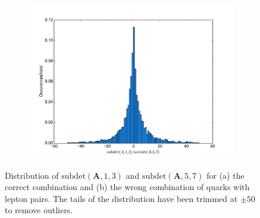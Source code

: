 \documentclass[twoside,english]{uiofysmaster}
\begin{document}
\begin{figure}[hbt]
	\begin{subfigure}[b]{0.6\textwidth}
		\includegraphics[width=\textwidth]{figures/improving_combinatorics/subdetA2_histogram_nosmear_trim50.pdf}
		\caption{ } 
		\label{fig:subdetA_distribution_b}
	\end{subfigure}
	\caption{Distribution of $\mathrm{subdet}(\mathbf{A},1,3)$ and $\mathrm{subdet}(\mathbf{A},5,7)$ for (a) the correct combination and (b) the wrong combination of quarks with lepton pairs. The tails of the distribution have been trimmed at $\pm 50$ to remove outliers.}
	\label{fig:subdetA_distribution}
\end{figure}
\end{document}
